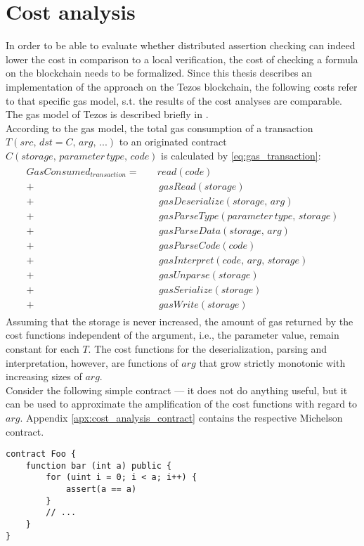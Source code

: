 \section{Cost analysis}
In order to be able to evaluate whether distributed assertion checking can indeed lower the cost in comparison to a local verification, the cost of checking a formula on the blockchain needs to be formalized. Since this thesis describes an implementation of the approach on the Tezos blockchain, the following costs refer to that specific gas model, s.t. the results of the cost analyses are comparable. The gas model of Tezos is described briefly in . \\
According to the gas model, the total gas consumption of a transaction $T(src,\, dst=C,\, arg, \, ...)$ to an originated contract $C(storage, \, parameter\, type, \, code)$ is calculated by \eqref{eq:gas_transaction}:
\begin{align}\label{eq:gas_transaction}
\begin{split}
GasConsumed_{transaction} = \quad &read(code) \\
+& \, gasRead(storage) \\
+& \, gasDeserialize(storage, \, arg) \\
+& \, gasParseType(parameter \, type, \, storage) \\
+& \, gasParseData(storage, \, arg) \\
+& \, gasParseCode(code) \\
+& \, gasInterpret(code, \, arg, \, storage) \\
+& \, gasUnparse(storage) \\
+& \, gasSerialize(storage) \\
+& \, gasWrite(storage)
\end{split}
\end{align}
Assuming that the storage is never increased, the amount of gas returned by the cost functions independent of the argument, i.e., the parameter value, remain constant for each $T$. The cost functions for the deserialization, parsing and interpretation, however, are functions of $arg$ that grow strictly monotonic with increasing sizes of $arg$. \\
Consider the following simple contract --- it does not do anything useful, but it can be used to approximate the amplification of the cost functions with regard to $arg$. Appendix \ref{apx:cost_analysis_contract} contains the respective Michelson contract. 
\begin{lstlisting}[numbers=none, language=Solidity]
contract Foo {
	function bar (int a) public {
		for (uint i = 0; i < a; i++) {
			assert(a == a)
		}
		// ...
	}
}
\end{lstlisting}

